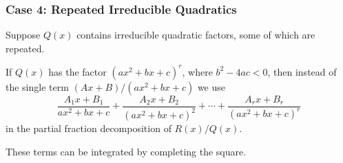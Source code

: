 \begin{frame}\frametitle{Case 4: Repeated Irreducible Quadratics }
Suppose $Q(x)$ contains irreducible quadratic factors, some of which are repeated.

If $Q(x)$ has the factor $(ax^2 + bx+c)^r$, where $b^2-4ac < 0$, then instead of the single term $(Ax+B)/(ax^2+bx+c)$ we use  
\[
\frac{A_1x+B_1}{ax^2+bx+c} + %
\frac{A_2x+B_2}{(ax^2+bx+c)^2} + %
 \cdots + %
\frac{A_rx+B_r}{(ax^2+bx+c)^r} %
\]
in the partial fraction decomposition of $R(x)/Q(x)$.

These terms can be integrated by completing the square.
\end{frame}
